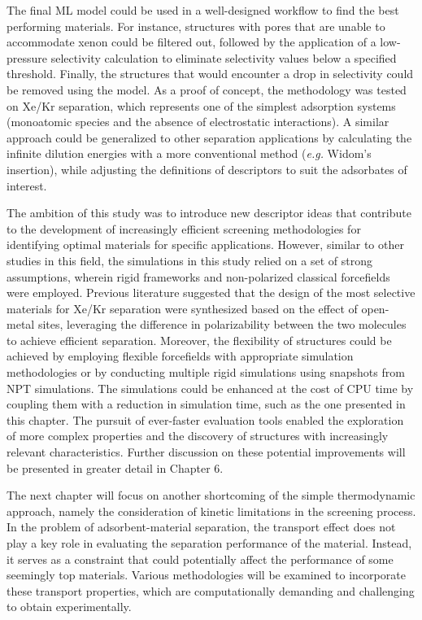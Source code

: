 \documentclass[main]{subfiles}
\begin{document}
The final ML model could be used in a well-designed workflow to find the best performing materials. For instance, structures with pores that are unable to accommodate xenon could be filtered out, followed by the application of a low-pressure selectivity calculation to eliminate selectivity values below a specified threshold. Finally, the structures that would encounter a drop in selectivity could be removed using the model. As a proof of concept, the methodology was tested on Xe/Kr separation, which represents one of the simplest adsorption systems (monoatomic species and the absence of electrostatic interactions). A similar approach could be generalized to other separation applications by calculating the infinite dilution energies with a more conventional method (\emph{e.g.} Widom's insertion), while adjusting the definitions of descriptors to suit the adsorbates of interest.

The ambition of this study was to introduce new descriptor ideas that contribute to the development of increasingly efficient screening methodologies for identifying optimal materials for specific applications. However, similar to other studies in this field, the simulations in this study relied on a set of strong assumptions, wherein rigid frameworks and non-polarized classical forcefields were employed. Previous literature suggested that the design of the most selective materials for Xe/Kr separation were synthesized based on the effect of open-metal sites, leveraging the difference in polarizability between the two molecules to achieve efficient separation.\autocite{Li_2019, Pei_2022} Moreover, the flexibility of structures could be achieved by employing flexible forcefields with appropriate simulation methodologies\autocite{Bousquet2012} or by conducting multiple rigid simulations using snapshots from NPT simulations\autocite{Witman_2017}. The simulations could be enhanced at the cost of CPU time by coupling them with a reduction in simulation time, such as the one presented in this chapter. The pursuit of ever-faster evaluation tools enabled the exploration of more complex properties and the discovery of structures with increasingly relevant characteristics. Further discussion on these potential improvements will be presented in greater detail in Chapter 6.

\vspace{1cm}

The next chapter will focus on another shortcoming of the simple thermodynamic approach, namely the consideration of kinetic limitations in the screening process. In the problem of adsorbent-material separation, the transport effect does not play a key role in evaluating the separation performance of the material. Instead, it serves as a constraint that could potentially affect the performance of some seemingly top materials. Various methodologies will be examined to incorporate these transport properties, which are computationally demanding and challenging to obtain experimentally.

\OnlyInSubfile{\printglobalbibliography}
\end{document}
